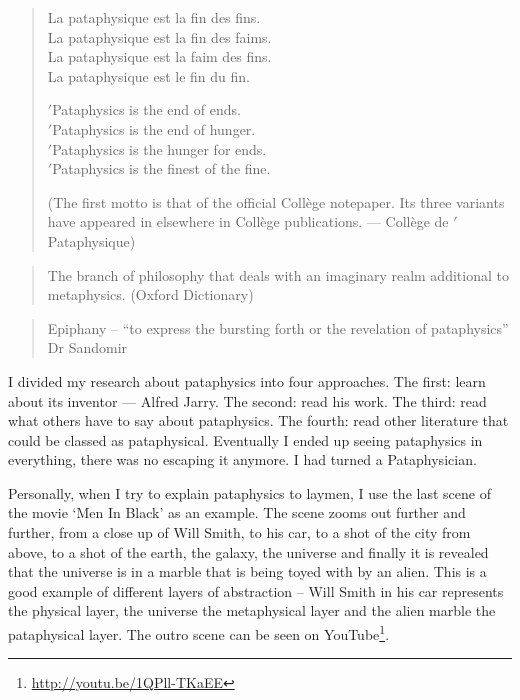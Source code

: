 \begin{quote}
  \begin{multicols}{2}
  La pataphysique est la fin des fins.\\
  La pataphysique est la fin des faims.\\
  La pataphysique est la faim des fins.\\
  La pataphysique est le fin du fin.
  \par \vfill \columnbreak{}
  \begin{flushright}
  $'$Pataphysics is the end of ends.\\
  $'$Pataphysics is the end of hunger.\\
  $'$Pataphysics is the hunger for ends.\\
  $'$Pataphysics is the finest of the fine.
  \end{flushright}
  \end{multicols}
  (The first motto is that of the official Collège notepaper. Its three variants have appeared in elsewhere in Collège publications. --- Collège de $'$Pataphysique) \autocite{Brotchie2003}
\end{quote}

\begin{quote}
  The branch of philosophy that deals with an imaginary realm additional to metaphysics. (Oxford Dictionary)
\end{quote}

\begin{quote}
  Epiphany – ``to express the bursting forth or the revelation of pataphysics'' Dr Sandomir \autocite[p.174]{Hugill2012a}
\end{quote}

I divided my research about pataphysics into four approaches. The first: learn about its inventor --- Alfred Jarry. The second: read his work. The third: read what others have to say about pataphysics. The fourth: read other literature that could be classed as pataphysical. Eventually I ended up seeing pataphysics in everything, there was no escaping it anymore. I had turned a Pataphysician.

Personally, when I try to explain pataphysics to laymen, I use the last scene of the movie `Men In Black' as an example. The scene zooms out further and further, from a close up of Will Smith, to his car, to a shot of the city from above, to a shot of the earth, the galaxy, the universe and finally it is revealed that the universe is in a marble that is being toyed with by an alien. This is a good example of different layers of abstraction – Will Smith in his car represents the physical layer, the universe the metaphysical layer and the alien marble the pataphysical layer. The outro scene can be seen on YouTube\footnote{\url{http://youtu.be/1QPll-TKaEE}}.

